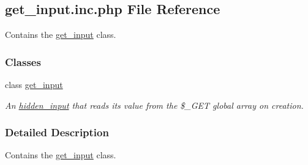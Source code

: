 \hypertarget{get__input_8inc_8php}{\subsection{get\-\_\-input.\-inc.\-php File Reference}
\label{get__input_8inc_8php}
}


Contains the \hyperlink{classget__input}{get\-\_\-input} class.  


\subsubsection*{Classes}
\begin{DoxyCompactItemize}
\item 
class \hyperlink{classget__input}{get\-\_\-input}
\begin{DoxyCompactList}\small\item\em An \hyperlink{classhidden__input}{hidden\-\_\-input} that reads its value from the \$\-\_\-\-G\-E\-T global array on creation. \end{DoxyCompactList}\end{DoxyCompactItemize}


\subsubsection{Detailed Description}
Contains the \hyperlink{classget__input}{get\-\_\-input} class. 